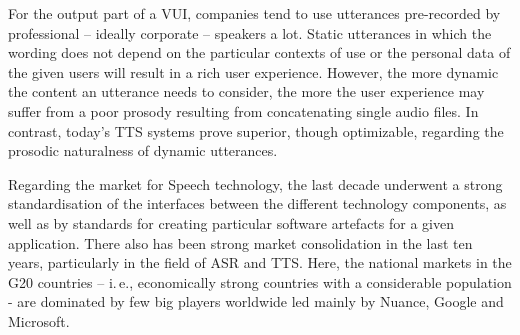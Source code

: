 \begin{multicols}{2}
For the output part of a VUI, companies tend to use utterances pre-recorded by professional – ideally corporate – speakers a lot. Static utterances in which the wording does not depend on the particular contexts of use or the personal data of the given users will result in a rich user experience. However, the more dynamic the content an utterance needs to consider, the more the user experience may suffer from a poor prosody resulting from concatenating single audio files. In contrast, today’s TTS systems prove superior, though optimizable, regarding the prosodic naturalness of dynamic utterances.  

Regarding the market for Speech technology, the last decade underwent a strong standardisation of the interfaces between the different technology components, as well as by standards for creating particular software artefacts for a given application. There also has been strong market consolidation in the last ten years, particularly in the field of ASR and TTS. Here, the national markets in the G20 countries – i.\,e., economically strong countries with a considerable population - are dominated by few big players worldwide led mainly by Nuance, Google and Microsoft. 


\end{multicols}
